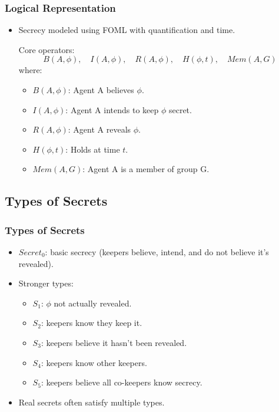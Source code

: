\documentclass[aspectratio=169]{beamer}
\begin{document}
\begin{frame}
\frametitle{Logical Representation}
\begin{itemize}
    \item Secrecy modeled using FOML with quantification and time.
    \begin{block}{Core operators:}
    \[ 
    B(A, \phi), \quad I(A, \phi), \quad R(A, \phi), \quad H(\phi, t), \quad Mem(A, G) 
    \]
    \normalsize where:
    \begin{itemize}
        \item $B(A, \phi)$: Agent A believes $\phi$.
        \item $I(A, \phi)$: Agent A intends to keep $\phi$ secret.
        \item $R(A, \phi)$: Agent A reveals $\phi$.
        \item $H(\phi, t)$: Holds at time $t$.
        \item $Mem(A, G)$: Agent A is a member of group G.
    \end{itemize}
    \end{block}
\end{itemize}
\end{frame}

\subsection{Types of Secrets}
\begin{frame}
\frametitle{Types of Secrets}
\Large
\begin{itemize}
    \item $Secret_0$: basic secrecy (keepers believe, intend, and do not believe it's revealed).
    \item Stronger types:
    \begin{itemize}
        \Large
        \item $S_1$: $\phi$ not actually revealed.
        \item $S_2$: keepers know they keep it.
        \item $S_3$: keepers believe it hasn't been revealed.
        \item $S_4$: keepers know other keepers.
        \item $S_5$: keepers believe all co-keepers know secrecy.
    \end{itemize}
    \item Real secrets often satisfy multiple types.
\end{itemize}
\end{frame}
\end{document}
